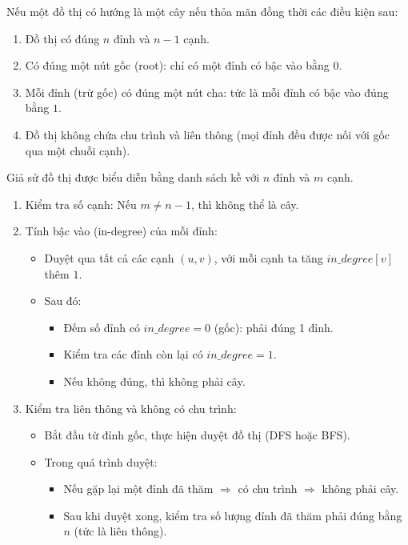 \documentclass{article}
\begin{document}
	\vspace{1em}
	Nếu một đồ thị có hướng là một cây nếu thỏa mãn đồng thời các điều kiện sau:
	
	\begin{enumerate}
		\item Đồ thị có đúng $n$ đỉnh và $n-1$ cạnh.
		\item Có đúng một nút gốc (root): chỉ có một đỉnh có bậc vào bằng $0$.
		\item Mỗi đỉnh (trừ gốc) có đúng một nút cha: tức là mỗi đỉnh có bậc vào đúng bằng $1$.
		\item Đồ thị không chứa chu trình và liên thông (mọi đỉnh đều được nối với gốc qua một chuỗi cạnh).
	\end{enumerate}
	
	\vspace{1em}
	
	Giả sử đồ thị được biểu diễn bằng danh sách kề với $n$ đỉnh và $m$ cạnh.
	
	\begin{enumerate}
		\item Kiểm tra số cạnh: Nếu $m \ne n - 1$, thì không thể là cây.
		
		\item Tính bậc vào (in-degree) của mỗi đỉnh:
		\begin{itemize}
			\item Duyệt qua tất cả các cạnh $(u, v)$, với mỗi cạnh ta tăng $in\_degree[v]$ thêm $1$.
			\item Sau đó:
			\begin{itemize}
				\item Đếm số đỉnh có $in\_degree = 0$ (gốc): phải đúng 1 đỉnh.
				\item Kiểm tra các đỉnh còn lại có $in\_degree = 1$.
				\item Nếu không đúng, thì không phải cây.
			\end{itemize}
		\end{itemize}
		
		\item Kiểm tra liên thông và không có chu trình:
		\begin{itemize}
			\item Bắt đầu từ đỉnh gốc, thực hiện duyệt đồ thị (DFS hoặc BFS).
			\item Trong quá trình duyệt:
			\begin{itemize}
				\item Nếu gặp lại một đỉnh đã thăm $\Rightarrow$ có chu trình $\Rightarrow$ không phải cây.
				\item Sau khi duyệt xong, kiểm tra số lượng đỉnh đã thăm phải đúng bằng $n$ (tức là liên thông).
			\end{itemize}
		\end{itemize}
	\end{enumerate}
	
\end{document}
